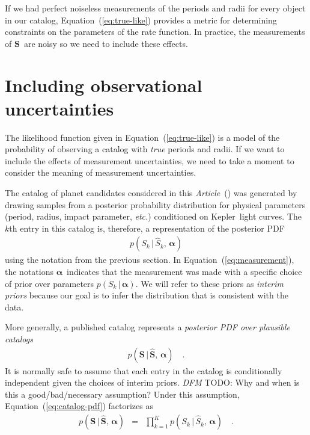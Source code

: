 \documentclass[12pt,preprint]{aastex}
\newcommand{\project}[1]{{\sffamily #1}}
\newcommand{\kepler}{\project{Kepler}}
\newcommand{\paper}{\emph{Article}}
\newcommand{\foreign}[1]{\emph{#1}}
\newcommand{\etc}{\foreign{etc.}}
\newcommand{\Eq}[1]{Equation~(\ref{eq:#1})}
\newcommand{\eq}[1]{\Eq{#1}}
\newcommand{\eqlabel}[1]{\label{eq:#1}}
\newcommand{\bvec}[1]{\ensuremath{\boldsymbol{#1}}}
\newcommand{\todo}[3]{{\color{#2} \emph{#1} TODO: #3}}
\newcommand{\dfmtodo}[1]{\todo{DFM}{red}{#1}}
\newcommand{\obs}[1]{\ensuremath{\hat{#1}}}
\newcommand{\entry}{\ensuremath{S}}
\newcommand{\catalog}{{\ensuremath{\bvec{\entry}}}}
\newcommand{\interim}{{\ensuremath{\bvec{\alpha}}}}
\begin{document}
If we had perfect noiseless measurements of the periods and radii for every
object in our catalog, \eq{true-like} provides a metric for determining
constraints on the parameters of the rate function.
In practice, the measurements of \catalog\ are noisy so we need to include
these effects.

\section{Including observational uncertainties}

The likelihood function given in \eq{true-like} is a model of the
probability of observing a catalog with \emph{true} periods and radii.
If we want to include the effects of measurement uncertainties, we need to
take a moment to consider the meaning of measurement uncertainties.

The catalog of planet candidates considered in this \paper\
(\citealt{petigura}) was generated by drawing samples from a posterior
probability distribution for physical parameters (period, radius, impact
parameter, \etc) conditioned on \kepler\ light curves.
The $k$th entry in this catalog is, therefore, a representation of the
posterior PDF
\begin{eqnarray}\eqlabel{measurement}
p(\entry_k\,|\,\obs{\entry}_k,\,\interim)
\end{eqnarray}
using the notation from the previous section.
In \eq{measurement}, the notations \interim\ indicates that the measurement
was made with a specific choice of prior over parameters
$p(\entry_k\,|\,\interim)$.
We will refer to these priors as \emph{interim priors} because our goal is to
infer the distribution that is consistent with the data.

More generally, a published catalog represents a \emph{posterior PDF over
plausible catalogs}
\begin{eqnarray}\eqlabel{catalog-pdf}
p(\catalog\,|\,\obs{\catalog},\,\interim) \quad.
\end{eqnarray}
It is normally safe to assume that each entry in the catalog is conditionally
independent given the choices of interim priors.
\dfmtodo{Why and when is this a good/bad/necessary assumption?}
Under this assumption, \eq{catalog-pdf} factorizes as
\begin{eqnarray}\eqlabel{catalog-factor}
p(\catalog\,|\,\obs{\catalog},\,\interim) &=&
\prod_{k=1}^K p(\entry_k\,|\,\obs{\entry}_k,\,\interim) \quad.
\end{eqnarray}
\end{document}
